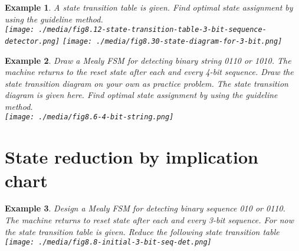 \documentclass{article}
\newtheorem{example}{Example}
\begin{document}
\begin{example}
  A state transition table is given. Find optimal state assignment by using the
  guideline method.\\
  \texttt{[image: ./media/fig8.12-state-transition-table-3-bit-sequence-detector.png]}%
  \texttt{[image: ./media/fig8.30-state-diagram-for-3-bit.png]}
\end{example}

\begin{example}
  Draw a Mealy FSM for detecting binary string 0110 or 1010. The machine returns
  to the reset state after each and every 4-bit sequence. Draw the state
  transition diagram on your own as practice problem. The state transition
  diagram is given here. Find optimal state assignment by using the guideline method.\\
  \texttt{[image: ./media/fig8.6-4-bit-string.png]}
\end{example}



\section{State reduction by implication chart}

\begin{example}
  Design a Mealy FSM for detecting binary sequence 010 or 0110. The machine
  returns to reset state after each and every 3-bit sequence. For now the state
  transition table is given.
  Reduce the following state transition table \\
  \texttt{[image: ./media/fig8.8-initial-3-bit-seq-det.png]}
\end{example}
\newpage
\end{document}
